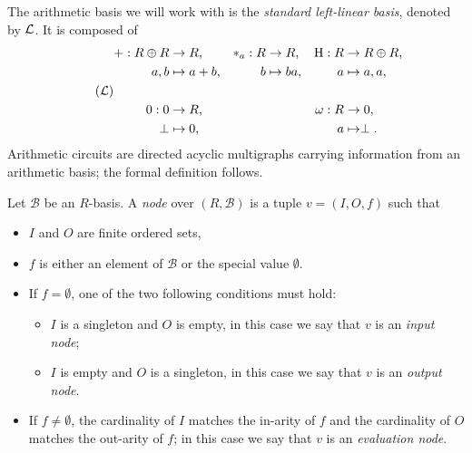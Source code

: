 The arithmetic basis we will work with is the
\emph{standard left-linear basis},
denoted by $\mathcal{L}$.  It is composed of
\begin{equation}
  \label{eq:tbasis}
  \tag{$\Tbasis$}
  \begin{aligned}
    + : R\oplus R &\ra R\text{,}    & \rmul{a} : R &\ra R\text{,}     &  \hub : R &\ra R\oplus R\text{,}\\
        a, b &\mapsto a+b\text{,}   &           b &\mapsto ba\text{,} &         a &\mapsto a,a\text{,}\\ \\
    0 : 0 &\ra R\text{,}     &&& \omega : R &\ra 0\text{,} \\
     \bom &\mapsto 0\text{,} &&&          a &\mapsto \bom\text{.}
  \end{aligned}
\end{equation}
Arithmetic circuits are directed acyclic multigraphs carrying
information from an arithmetic basis; the formal definition follows.

\begin{definition}
  Let $\mathcal{B}$ be an $R$-basis. A \emph{node} over
  $(R,\mathcal{B})$ is a tuple $v=(I, O, f)$ such that
  \begin{itemize}
  \item $I$ and $O$ are finite ordered sets, 
  \item $f$ is either an element of $\mathcal{B}$ or the special value
    $\emptyset$.
  \item If $f=\emptyset$, one of the two following conditions must hold:
    \begin{itemize}
    \item $I$ is a singleton and $O$ is empty, in this case we say
      that $v$ is an \emph{input node};
    \item $I$ is empty and $O$ is a singleton, in this case we say
      that $v$ is an \emph{output node}.
    \end{itemize}
  \item If $f\ne\emptyset$, the cardinality of $I$ matches the
    in-arity of $f$ and the cardinality of $O$ matches the out-arity
    of $f$; in this case we say that $v$ is an
    \emph{evaluation node}.
  \end{itemize}
\end{definition}

